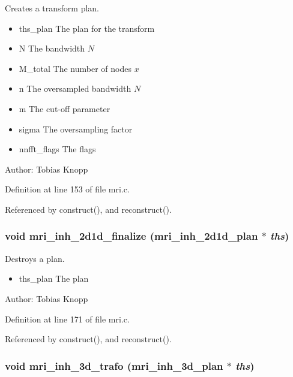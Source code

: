 Creates a transform plan. 

\begin{itemize}
\item ths\_\-plan The plan for the transform \item N The bandwidth $N$ \item M\_\-total The number of nodes $x$ \item n The oversampled bandwidth $N$ \item m The cut-off parameter \item sigma The oversampling factor \item nnfft\_\-flags The flags\end{itemize}
\begin{Desc}
\item[Author:]Tobias Knopp \end{Desc}


Definition at line 153 of file mri.c.

Referenced by construct(), and reconstruct().\hypertarget{group__mri_gaa9aa7ca6642fde2d6926a6430149fa1}{
\subsubsection{\setlength{\rightskip}{0pt plus 5cm}void mri\_\-inh\_\-2d1d\_\-finalize ({\bf mri\_\-inh\_\-2d1d\_\-plan} $\ast$ {\em ths})}}
\label{group__mri_gaa9aa7ca6642fde2d6926a6430149fa1}


Destroys a plan. 

\begin{itemize}
\item ths\_\-plan The plan\end{itemize}
\begin{Desc}
\item[Author:]Tobias Knopp \end{Desc}


Definition at line 171 of file mri.c.

Referenced by construct(), and reconstruct().\hypertarget{group__mri_gd95016880bd9ad2af3e59185c5312d99}{
\subsubsection{\setlength{\rightskip}{0pt plus 5cm}void mri\_\-inh\_\-3d\_\-trafo ({\bf mri\_\-inh\_\-3d\_\-plan} $\ast$ {\em ths})}}
\label{group__mri_gd95016880bd9ad2af3e59185c5312d99}


